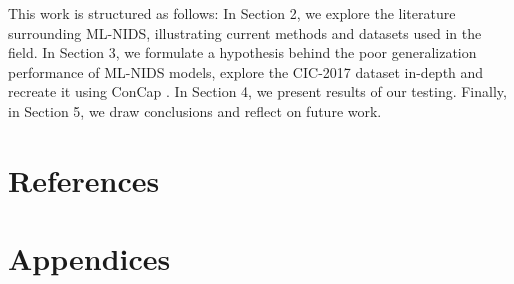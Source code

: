 \documentclass[english]{article}
\begin{document}
	This work is structured as follows: In Section 2, we explore the literature surrounding ML-NIDS, illustrating current methods and datasets used in the field. In Section 3, we formulate a hypothesis behind the poor generalization performance of ML-NIDS models, explore the CIC-2017 dataset in-depth and recreate it using ConCap \cite{concap}. In Section 4, we present results of our testing. Finally, in Section 5, we draw conclusions and reflect on future work.
	
	\newpage
	
	
	\newpage
	
	
	\newpage
	
	
	\newpage
	
	
	
	
	\newpage
	\section{References}
	\printbibliography[heading=none]
	\newpage
	\section{Appendices}
	
	
\end{document}
